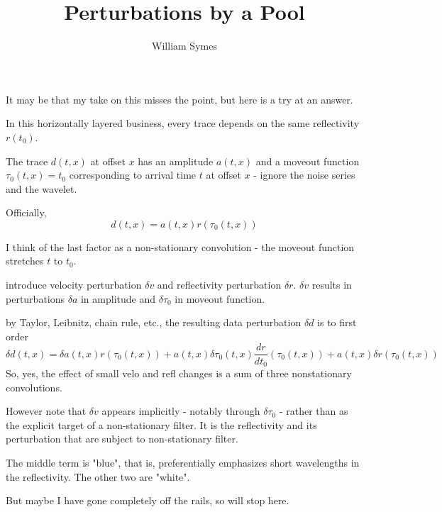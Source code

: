 
\title{Perturbations by a Pool}
\date{}
\address{
}
\author{William Symes\footnotemark[1]}


\maketitle
\parskip 12pt

It may be that my take on this misses the point, but here is a try at an answer.

In this horizontally layered business, every trace depends on the same reflectivity $r(t_0)$.

The trace $d(t,x)$ at offset $x$ has an amplitude $a(t,x)$ and a moveout function $\tau_0(t,x) = t_0$ corresponding to arrival time $t$ at offset $x$ - ignore the noise series and the wavelet.

Officially, 
\[d(t,x) = a(t,x) r(\tau_0(t,x))\]

I think of the last factor as a non-stationary convolution - the moveout function stretches $t$ to $t_0$.

introduce velocity perturbation $\delta v$ and reflectivity perturbation $\delta r$. $\delta v$ results in perturbations $\delta a$ in amplitude and $\delta \tau_0$ in moveout function.

by Taylor, Leibnitz, chain rule, etc., the resulting data perturbation $\delta d$  is to first order
\[
\delta d(t,x) = \delta a(t,x) r(\tau_0(t,x)) + a(t,x) \delta \tau_0(t,x) \frac{dr}{dt_0} (\tau_0(t,x)) + a(t,x) \delta r(\tau_0(t,x))
\]
So, yes, the effect of small velo and refl changes is a sum of three nonstationary convolutions.

However note that $\delta v$ appears implicitly - notably through $\delta \tau_0$ - rather than as the explicit target of a non-stationary filter. It is the reflectivity and its perturbation that are subject to non-stationary filter.

The middle term is "blue", that is, preferentially emphasizes short wavelengths in the reflectivity. The other two are "white".

But maybe I have gone completely off the rails, so will stop here.

